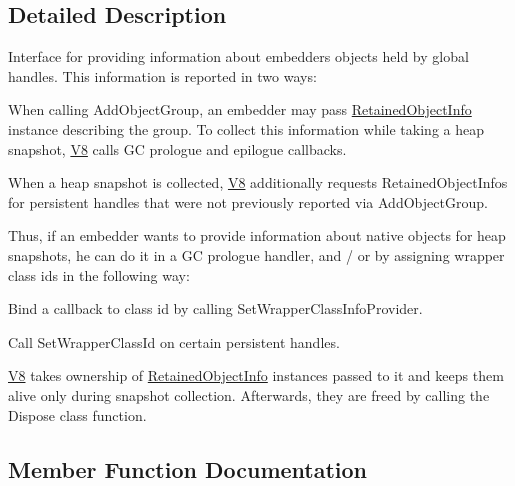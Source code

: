 \subsection{Detailed Description}
Interface for providing information about embedder\textquotesingle{}s objects held by global handles. This information is reported in two ways\+:


\begin{DoxyEnumerate}
\item When calling Add\+Object\+Group, an embedder may pass \hyperlink{classv8_1_1_retained_object_info}{Retained\+Object\+Info} instance describing the group. To collect this information while taking a heap snapshot, \hyperlink{classv8_1_1_v8}{V8} calls GC prologue and epilogue callbacks.
\item When a heap snapshot is collected, \hyperlink{classv8_1_1_v8}{V8} additionally requests Retained\+Object\+Infos for persistent handles that were not previously reported via Add\+Object\+Group.
\end{DoxyEnumerate}

Thus, if an embedder wants to provide information about native objects for heap snapshots, he can do it in a GC prologue handler, and / or by assigning wrapper class ids in the following way\+:


\begin{DoxyEnumerate}
\item Bind a callback to class id by calling Set\+Wrapper\+Class\+Info\+Provider.
\item Call Set\+Wrapper\+Class\+Id on certain persistent handles.
\end{DoxyEnumerate}

\hyperlink{classv8_1_1_v8}{V8} takes ownership of \hyperlink{classv8_1_1_retained_object_info}{Retained\+Object\+Info} instances passed to it and keeps them alive only during snapshot collection. Afterwards, they are freed by calling the Dispose class function. 

\subsection{Member Function Documentation}
